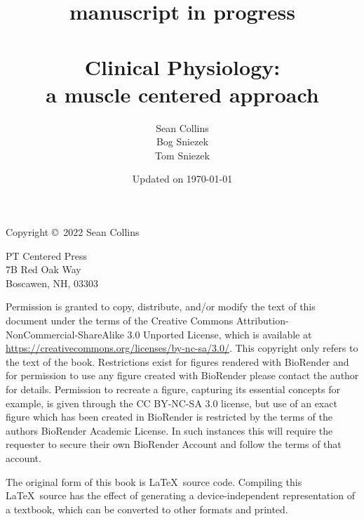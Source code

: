 
% 




\title{manuscript in progress \\~\\ {\bf{\huge{Clinical Physiology:}}  \\ a muscle centered approach}}

\author{Sean Collins \\ Bog Sniezek \\ Tom Sniezek}

\date{Updated on \today}
\maketitle

\pagebreak
\thispagestyle{empty}

{\small
Copyright \copyright ~2022 Sean Collins


\vspace{0.2in}

\begin{flushleft}
PT Centered Press       \\
7B Red Oak Way        \\
Boscawen, NH, 03303
\end{flushleft}

Permission is granted to copy, distribute, and/or modify the text of this document under the terms of the Creative Commons Attribution-NonCommercial-ShareAlike 3.0 Unported License, which is available at \url{https://creativecommons.org/licenses/by-nc-sa/3.0/}. This copyright only refers to the text of the book. Restrictions exist for figures rendered with BioRender and for permission to use any figure created with BioRender please contact the author for details. Permission to recreate a figure, capturing its essential concepts for example, is given through the CC BY-NC-SA 3.0 license, but use of an exact figure which has been created in BioRender is restricted by the terms of the authors BioRender Academic License. In such instances this will require the requester to secure their own BioRender Account and follow the terms of that account.

The original form of this book is \LaTeX\ source code.  Compiling this \LaTeX\ source has the effect of generating a device-independent representation of a textbook, which can be converted to other formats and printed.

\vspace{0.2in}

} %

